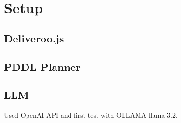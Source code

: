 \chapter{Setup}
\section{Deliveroo.js}
\section{PDDL Planner}
\section{LLM}

Used OpenAI API and first test with OLLAMA llama 3.2.